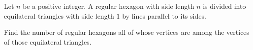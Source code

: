 Let $n$ be a positive integer. A regular hexagon with side length $n$ is divided into equilateral triangles with side length $1$ by lines parallel to its sides.

Find the number of regular hexagons all of whose vertices are among the vertices of those equilateral triangles.
